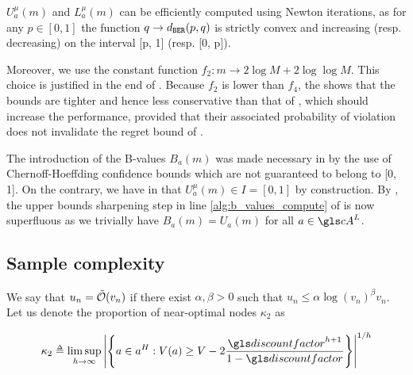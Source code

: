 $U^{\mu}_a(m)$ and $L^{\mu}_a(m)$ can be efficiently computed using Newton iterations, as for any $p\in[0, 1]$ the function $q \rightarrow d_\texttt{BER}(p,q)$ is strictly convex and increasing (resp. decreasing) on the interval [p, 1] (resp. [0, p]).

Moreover, we use the constant function $f_2: m \rightarrow 2 \log M + 2 \log\log M$. This choice is justified in the end of . Because $f_2$ is lower than $f_4$, the  shows that the bounds are tighter and hence less conservative than that of \OLOP, which should increase the performance, provided that their associated probability of violation does not invalidate the regret bound of \OLOP.


\begin{remark}
	\label{rmk:sharpen}
	\begin{leftbar}[remarkbar]
	The introduction of the B-values $B_a(m)$ was made necessary in \OLOP by the use of Chernoff-Hoeffding confidence bounds which are not guaranteed to belong to [0, 1]. On the contrary, we have in \KLOLOP that $U^\mu_a(m) \in I = [0,1]$ by construction. By , the upper bounds sharpening step in line \ref{alg:b_values_compute} of  is now superfluous as we trivially have $B_a(m) = U_a(m)$ for all $a\in \cA^L$.
	\end{leftbar}
\end{remark}

\subsection{Sample complexity}
\label{sec:sample-complexity}

We say that $u_n = \tilde{\mathcal{O}}(v_n)$ if there exist $\alpha, \beta >0$ such that $u_n \leq \alpha \log(v_n)^\beta v_n$.
Let us denote the proportion of near-optimal nodes $\kappa_2$ as


\begin{equation*}
\label{eq:kappa}
\kappa_2 \eqdef \limsup_{h\rightarrow\infty}{\left|\left\{a\in a^H:V(a) \geq V - 2\frac{\discount^{h+1}}{1-\discount}\right\}\right|^{1/h}}
\end{equation*}


